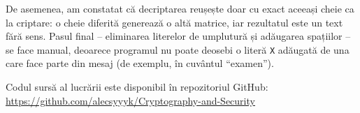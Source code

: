 \documentclass[12pt,a4paper]{article}
\begin{document}
De asemenea, am constatat că decriptarea reușește doar cu exact aceeași cheie ca la
criptare: o cheie diferită generează o altă matrice, iar rezultatul este un text
fără sens. Pasul final -- eliminarea literelor de umplutură și adăugarea spațiilor --
se face manual, deoarece programul nu poate deosebi o literă \texttt{X} adăugată de
una care face parte din mesaj (de exemplu, în cuvântul \enquote{examen}).

Codul sursă al lucrării este disponibil în repozitoriul GitHub:\\
\url{https://github.com/alecsyyyk/Cryptography-and-Security}
\end{document}
